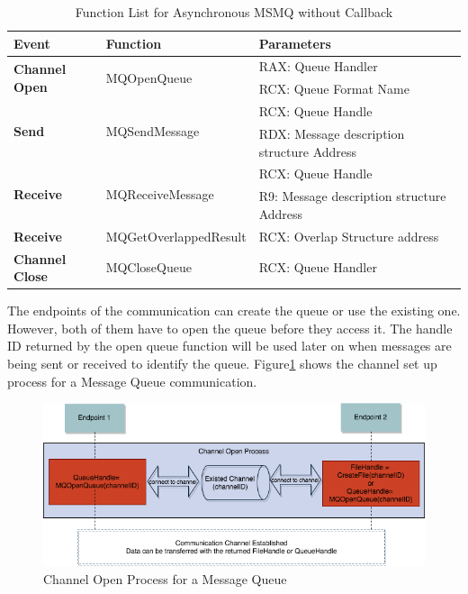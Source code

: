     \begin{table}[H]
        \centering
        \caption{Function List for Asynchronous MSMQ without Callback}
        \label{msmqasynfunctions}
        \begin{tabular}{|l|l|l|}
            \hline
             \textbf{Event} & \textbf{Function}& \textbf{Parameters}  \\
             \hline
             \multirow{2}{*}{{\textbf{Channel Open}}}
             &\multirow{2}{*}{{MQOpenQueue}} &  RAX: Queue Handler\\
              \cline{3-3} 
             & &  RCX: Queue Format Name\\
            \hline
             \multirow{2}{*}{{\textbf{Send}}}
             &\multirow{2}{*}{MQSendMessage} &  RCX: Queue Handle \\
              \cline{3-3} 
             &&  RDX: Message description structure Address \\
            \hline
             \multirow{2}{*}{{\textbf{Receive}}}
             & \multirow{2}{*}{MQReceiveMessage}&  RCX: Queue Handle \\
              \cline{3-3} 
              &&  R9: Message description structure Address \\
              \hline
              \textbf{Receive} 
              & MQGetOverlappedResult &  RCX: Overlap Structure address  \\
            \hline
            \textbf{Channel Close} &MQCloseQueue & RCX: Queue Handler \\
            \hline
        \end{tabular}
    \end{table}
    
The endpoints of the communication can create the queue or use the existing one. However, both of them have to open the queue before they access it. The handle ID returned by the open queue function will be used later on when messages are being sent or received to identify the queue. Figure\ref{msmqopen} shows the channel set up process for a Message Queue communication.
\begin{figure}[H]
\centerline{\includegraphics[scale=0.55]{Figures/msmqchannelopen}}
 \caption{Channel Open Process for a Message Queue}
\label{msmqopen}
\end{figure}
    
